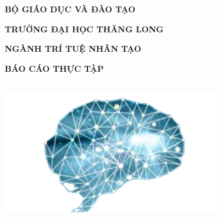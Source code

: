 \documentclass{article}
\begin{document}
\centering %

{\bfseries BỘ GIÁO DỤC VÀ ĐÀO TẠO} \par
{\bfseries TRƯỜNG ĐẠI HỌC THĂNG LONG} \par
{\bfseries NGÀNH TRÍ TUỆ NHÂN TẠO} \par

\vspace{2cm}
{\bfseries BÁO CÁO THỰC TẬP} \par
\vspace{2cm}

\includegraphics*[width=3.77in, height=2.47in]{image1}
\end{document}

